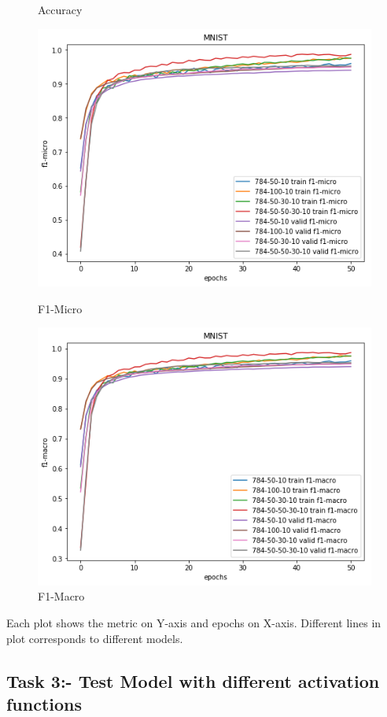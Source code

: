 \documentclass{article}
\begin{document}
\begin{figure}[!htb]
	\caption{Accuracy}\label{fig:part_1_task_2_accuracy}
	\endminipage\hfill
	\includegraphics[width=\linewidth]{../output_plots/part_1_task_2_f1-micro.png}
	\caption{F1-Micro}\label{fig:part_1_task_2_f1-micro}
	\endminipage
	\includegraphics[width=\linewidth]{../output_plots/part_1_task_2_f1-macro.png}
	\caption{F1-Macro}\label{fig:part_1_task_2_f1-macro}
	\endminipage
\end{figure}

Each plot shows the metric on Y-axis and epochs on X-axis. Different lines in plot corresponds to different models.

\subsection{Task 3:- Test Model with different activation functions}
\end{document}
